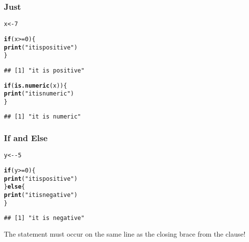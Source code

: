 \documentclass[12pt]{beamer}\usepackage[]{graphicx}\usepackage[]{color}
\makeatletter
\newcommand{\hlnum}[1]{\textcolor[rgb]{0.686,0.059,0.569}{#1}}%
\newcommand{\hlstr}[1]{\textcolor[rgb]{0.192,0.494,0.8}{#1}}%
\newcommand{\hlopt}[1]{\textcolor[rgb]{0,0,0}{#1}}%
\newcommand{\hlstd}[1]{\textcolor[rgb]{0.345,0.345,0.345}{#1}}%
\newcommand{\hlkwa}[1]{\textcolor[rgb]{0.161,0.373,0.58}{\textbf{#1}}}%
\newcommand{\hlkwb}[1]{\textcolor[rgb]{0.69,0.353,0.396}{#1}}%
\newcommand{\hlkwd}[1]{\textcolor[rgb]{0.737,0.353,0.396}{\textbf{#1}}}%
\newenvironment{kframe}{%
 \def\at@end@of@kframe{}%
 \ifinner\ifhmode%
  \def\at@end@of@kframe{\end{minipage}}%
  \begin{minipage}{\columnwidth}%
 \fi\fi%
 \def\FrameCommand##1{\hskip\@totalleftmargin \hskip-\fboxsep
 \colorbox{shadecolor}{##1}\hskip-\fboxsep
     \hskip-\linewidth \hskip-\@totalleftmargin \hskip\columnwidth}%
 \MakeFramed {\advance\hsize-\width
   \@totalleftmargin\z@ \linewidth\hsize
   \@setminipage}}%
 {\par\unskip\endMakeFramed%
 \at@end@of@kframe}
\newenvironment{knitrout}{}{} %
\makeatother
\begin{document}
\begin{frame}[fragile]
\frametitle{Just }

\begin{knitrout}\footnotesize
{}\color{fgcolor}\begin{kframe}
\begin{alltt}
\hlstd{x} \hlkwb{<-} \hlnum{7}

\hlkwa{if} \hlstd{(x} \hlopt{>=} \hlnum{0}\hlstd{) \{}
  \hlkwd{print}\hlstd{(}\hlstr{"it is positive"}\hlstd{)}
\hlstd{\}}
\end{alltt}
\begin{verbatim}
## [1] "it is positive"
\end{verbatim}
\begin{alltt}
\hlkwa{if} \hlstd{(}\hlkwd{is.numeric}\hlstd{(x)) \{}
  \hlkwd{print}\hlstd{(}\hlstr{"it is numeric"}\hlstd{)}
\hlstd{\}}
\end{alltt}
\begin{verbatim}
## [1] "it is numeric"
\end{verbatim}
\end{kframe}
\end{knitrout}

\end{frame}


\begin{frame}[fragile]
\frametitle{If and Else}

\begin{knitrout}\footnotesize
{}\color{fgcolor}\begin{kframe}
\begin{alltt}
\hlstd{y} \hlkwb{<-} \hlopt{-}\hlnum{5}

\hlkwa{if} \hlstd{(y} \hlopt{>=} \hlnum{0}\hlstd{) \{}
  \hlkwd{print}\hlstd{(}\hlstr{"it is positive"}\hlstd{)}
\hlstd{\}} \hlkwa{else} \hlstd{\{}
  \hlkwd{print}\hlstd{(}\hlstr{"it is negative"}\hlstd{)}
\hlstd{\}}
\end{alltt}
\begin{verbatim}
## [1] "it is negative"
\end{verbatim}
\end{kframe}
\end{knitrout}
The  statement must occur on the same line as the closing brace from the  clause!

\end{frame}
\end{document}
